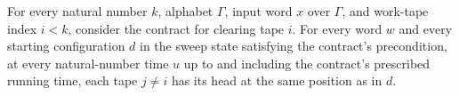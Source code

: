 \begin{theorem}
\label{Turing.clearTM_contract_traj}
\leanok
{}
For every natural number $k$, alphabet $\Gamma$, input word $x$ over $\Gamma$, and
work-tape index $i<k$, consider the contract for clearing tape $i$. For every word $w$
and every starting configuration $d$ in the sweep state satisfying the contract's
precondition, at every natural-number time $u$ up to and including the contract's
prescribed running time, each tape $j\ne i$ has its head at the same position as in $d$.
\end{theorem}
